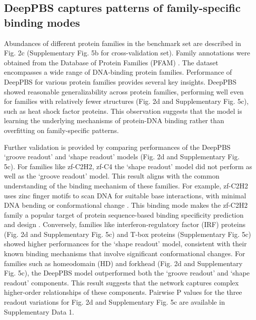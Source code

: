 \subsection{DeepPBS captures patterns of family-specific binding modes}
Abundances of different protein families in the benchmark set are described in Fig. 2c (Supplementary Fig. 5b for cross-validation set). Family annotations were obtained from the Database of Protein Families (PFAM) \citep{Mistry2021}. The dataset encompasses a wide range of DNA-binding protein families. Performance of DeepPBS for various protein families provides several key insights. DeepPBS showed reasonable generalizability across protein families, performing well even for families with relatively fewer structures (Fig. 2d and Supplementary Fig. 5c), such as heat shock factor proteins. This observation suggests that the model is learning the underlying mechanisms of protein-DNA binding rather than overfitting on family-specific patterns.
\par
Further validation is provided by comparing performances of the DeepPBS ‘groove readout’ and ‘shape readout’ models (Fig. 2d and Supplementary Fig. 5c). For families like zf-C2H2, zf-C4 the ‘shape readout’ model did not perform as well as the ‘groove readout’ model. This result aligns with the common understanding of the binding mechanism of these families. For example, zf-C2H2 uses zinc finger motifs to scan DNA for suitable base interactions, with minimal DNA bending or conformational change \citep{Persikov2011}. This binding mode makes the zf-C2H2 family a popular target of protein sequence-based binding specificity prediction and design \citep{Persikov2014, persikov2009predicting, aizenshtein2022deepzf, Yanover2011, Ichikawa2023}. Conversely, families like interferon-regulatory factor (IRF) proteins (Fig. 2d and Supplementary Fig. 5c) and T-box proteins (Supplementary Fig. 5c) showed higher performances for the ‘shape readout’ model, consistent with their known binding mechanisms that involve significant conformational changes\citep{Stirnimann2010, Escalante1998}. For families such as homeodomain (HD) and forkhead (Fig. 2d and Supplementary Fig. 5c), the DeepPBS model outperformed both the ‘groove readout’ and ‘shape readout’ components. This result suggests that the network captures complex higher-order relationships of these components. Pairwise P values for the three readout variations for Fig. 2d and Supplementary Fig. 5c are available in Supplementary Data 1.

